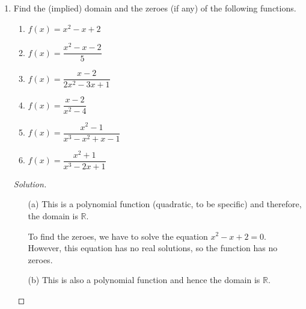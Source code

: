 \documentclass[12pt]{article}
\newenvironment{solution}{\begin{proof}[Solution]}{\end{proof}}
\begin{document}
\begin{enumerate}
\begin{enumerate}
			\item $f(x)=\dfrac{1+x}{1+x^2}$
		
			\item $f(x)=\dfrac{1+x}{1+\sqrt{x}}$
		
		\end{enumerate}
		
		\begin{solution}
			\begin{itemize}
				\item[(a)] Power function.
				\item[(b)] 	Polynomial function, power function, rational function.
				\item[(c)] Polynomial function, power function, rational function.
				\item[(d)] Algebraic function.
				\item[(e)] 	Algebraic function.
				\item[(f)] Rational function.
				\item[(g)] 	Algebraic function.
			\end{itemize}
		\end{solution}
		
		\item Find the (implied) domain and the zeroes (if any) of the following functions.
		\begin{enumerate}
			\item $f(x)=x^2-x+2$
		
			\item $f(x)=\dfrac{x^2-x-2}{5}$
		
			\item $f(x)=\dfrac{x-2}{2x^2-3x+1}$
		
			\item $f(x)=\dfrac{x-2}{x^2-4}$
		
			\item $f(x)=\dfrac{x^2-1}{x^3-x^2+x-1}$
			
			\item $f(x)=\dfrac{x^2+1}{x^3-2x+1}$
			
	
		\end{enumerate}
		
		\begin{solution}
			\begin{itemize}
				\item[(a)] 	This is a polynomial function (quadratic, to be specific) and therefore, the domain is $\mathbb{R}$.
				
				To find the zeroes, we have to solve the equation $x^2-x+2=0$. However, this equation has no real solutions, so the function has no zeroes.
				\item[(b)] This is also a polynomial function and hence the domain is $\mathbb{R}$. 
				

\end{itemize}
\end{solution}
\end{enumerate}
\end{document}
